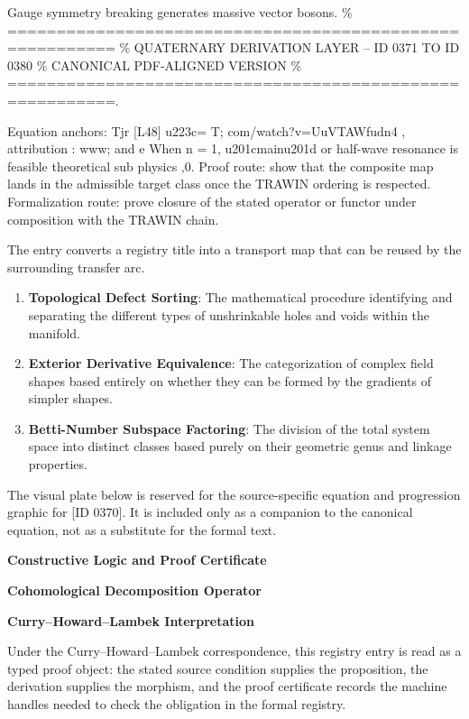 Gauge symmetry breaking generates massive vector bosons. \% ========================================================= \% QUATERNARY DERIVATION LAYER -- ID 0371 TO ID 0380 \% CANONICAL PDF-ALIGNED VERSION \% =========================================================.

Equation anchors: Tjr [L48] u223c= T; com/watch?v=UuVTAWfudn4 , attribution : www; and e When n = 1, u201cmainu201d or half-wave resonance is feasible theoretical sub physics ,0. Proof route: show that the composite map lands in the admissible target class once the TRAWIN ordering is respected. Formalization route: prove closure of the stated operator or functor under composition with the TRAWIN chain.

The entry converts a registry title into a transport map that can be reused by the surrounding transfer arc.
\endgroup

\begin{enumerate}[leftmargin=1.6em,itemsep=6pt,topsep=4pt]
\item \textbf{Topological Defect Sorting}: The mathematical procedure identifying and separating the different types of unshrinkable holes and voids within the manifold.
\item \textbf{Exterior Derivative Equivalence}: The categorization of complex field shapes based entirely on whether they can be formed by the gradients of simpler shapes.
\item \textbf{Betti-Number Subspace Factoring}: The division of the total system space into distinct classes based purely on their geometric genus and linkage properties.
\end{enumerate}

\begingroup\footnotesize\sloppy
The visual plate below is reserved for the source-specific equation and progression graphic for [ID 0370]. It is included only as a companion to the canonical equation, not as a substitute for the formal text.
\par\endgroup
\ifTZPDarkEdition
{}
\fi

\clearpage
\begingroup\tzpsupportsetup
\noindent\textbf{\fontsize{10.8pt}{12.8pt}\selectfont [ID 0370] Constructive Logic and Proof Certificate}\par
\noindent\textbf{\fontsize{10pt}{12pt}\selectfont Cohomological Decomposition Operator}\par
\vspace{0.45em}
\begingroup
\footnotesize
\setlength{\parskip}{0.22em}
\setlength{\parindent}{0pt}
\noindent\textbf{Curry--Howard--Lambek Interpretation}\par
Under the Curry--Howard--Lambek correspondence, this registry entry is read as a typed proof
object: the stated source condition supplies the proposition, the derivation supplies the
morphism, and the proof certificate records the machine handles needed to check the obligation
in the formal registry.

